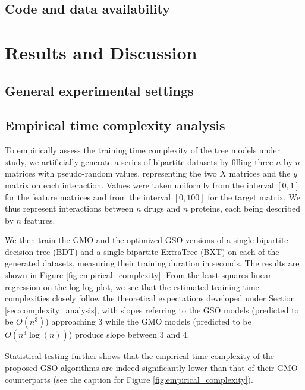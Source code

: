 \subsection{Code and data availability}

\section{Results and Discussion}

\subsection{General experimental settings}


\subsection{Empirical time complexity analysis}
\label{sec:empirical_complexity}

To empirically assess the training time complexity of the tree models under study, we artificially generate a series of bipartite datasets by filling three $n$ by $n$ matrices with pseudo-random values, representing the two $X$ matrices and the $y$ matrix on each interaction. Values were taken uniformly from the interval $[0, 1]$ for the feature matrices and from the interval $[0, 100]$ for the target matrix. We thus represent interactions between $n$ drugs and $n$ proteins, each being described by $n$ features.

We then train the GMO and the optimized GSO versions of a single bipartite decision tree (BDT) and a single bipartite ExtraTree (BXT) on each of the generated datasets, measuring their training duration in seconds. The results are shown in Figure \ref{fig:empirical_complexity}. From the least squares linear regression on the log-log plot, we see that the estimated training time complexities closely follow the theoretical expectations developed under Section \ref{sec:complexity_analysis}, with slopes referring to the GSO models (predicted to be $O(n^3)$) approaching 3 while the GMO models (predicted to be $O(n^3\log(n))$) produce slope between 3 and 4.

Statistical testing further shows that the empirical time complexity of the proposed GSO algorithms are indeed significantly lower than that of their GMO counterparts (see the caption for Figure \ref{fig:empirical_complexity}).



